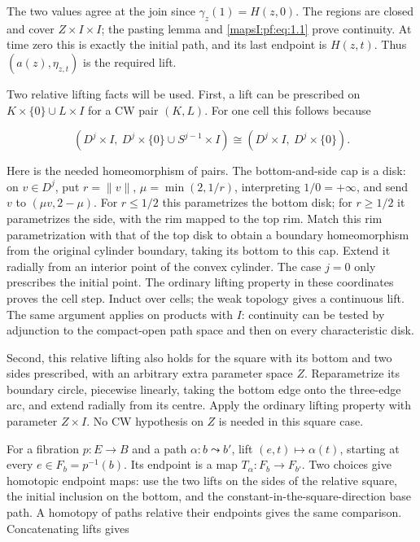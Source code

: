 \documentclass[11pt]{article}
\begin{document}
The two values agree at the join since \(\gamma_z(1)=H(z,0)\). The regions are closed and cover \(Z\times I\times I\); the pasting lemma and \eqref{mapsI:pf:eq:1.1} prove continuity. At time zero this is exactly the initial path, and its last endpoint is \(H(z,t)\). Thus \((a(z),\eta_{z,t})\) is the required lift.

Two relative lifting facts will be used. First, a lift can be prescribed on \(K\times\{0\}\cup L\times I\) for a CW pair \((K,L)\). For one cell this follows because

\begin{equation}
(D^j\times I,\ D^j\times\{0\}\cup S^{j-1}\times I)
\cong(D^j\times I,\ D^j\times\{0\}).
\label{mapsI:pf:eq:1.5}
\end{equation}

Here is the needed homeomorphism of pairs. The bottom-and-side cap is a disk: on \(v\in D^j\), put \(r=\|v\|\), \(\mu=\min(2,1/r)\), interpreting \(1/0=+\infty\), and send \(v\) to \((\mu v,2-\mu)\). For \(r\leq1/2\) this parametrizes the bottom disk; for \(r\geq1/2\) it parametrizes the side, with the rim mapped to the top rim. Match this rim parametrization with that of the top disk to obtain a boundary homeomorphism from the original cylinder boundary, taking its bottom to this cap. Extend it radially from an interior point of the convex cylinder. The case \(j=0\) only prescribes the initial point. The ordinary lifting property in these coordinates proves the cell step. Induct over cells; the weak topology gives a continuous lift. The same argument applies on products with \(I\): continuity can be tested by adjunction to the compact-open path space and then on every characteristic disk.

Second, this relative lifting also holds for the square with its bottom and two sides prescribed, with an arbitrary extra parameter space \(Z\). Reparametrize its boundary circle, piecewise linearly, taking the bottom edge onto the three-edge arc, and extend radially from its centre. Apply the ordinary lifting property with parameter \(Z\times I\). No CW hypothesis on \(Z\) is needed in this square case.

For a fibration \(p:E\to B\) and a path \(\alpha:b\leadsto b'\), lift \((e,t)\mapsto\alpha(t)\), starting at every \(e\in F_b=p^{-1}(b)\). Its endpoint is a map \(T_\alpha:F_b\to F_{b'}\). Two choices give homotopic endpoint maps: use the two lifts on the sides of the relative square, the initial inclusion on the bottom, and the constant-in-the-square-direction base path. A homotopy of paths relative their endpoints gives the same comparison. Concatenating lifts gives
\end{document}
